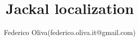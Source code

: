 \documentclass[10pt]{article}
\begin{document}
\setlength\parindent{0pt}

\title{Jackal localization}
\author{Federico Oliva(federico.oliva.it@gmail.com)}

\maketitle
\renewcommand*\contentsname{{}}

\tableofcontents








\newpage
{\small
	
	
}
\end{document}
